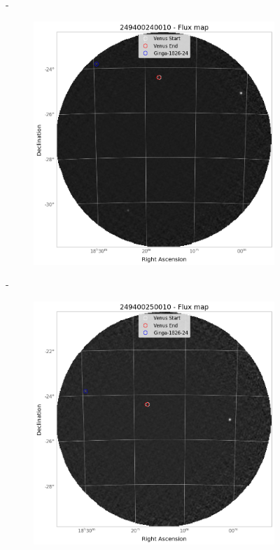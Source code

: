 \documentclass[
	a4paper, %
	10pt, %
	unnumberedsections, %
	twoside, %
]{LTJournalArticle}
\begin{document}
\begin{figure}[H]
\begin{subfigure}{.3\textwidth}
        \end{subfigure}
        \hspace{1em}-
        \begin{subfigure}{.3\textwidth}
            \centering
            \includegraphics[width=\textwidth]{report/Figures/methods/2204/24_map.png}
        \end{subfigure}
        \hspace{1em}-
        \begin{subfigure}{.3\textwidth}
            \centering
            \includegraphics[width=\textwidth]{report/Figures/methods/2204/25_map.png}

\end{subfigure}
\end{figure}
\end{document}
